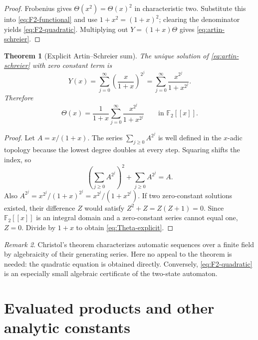 \documentclass[11pt,oneside]{article}
\newtheorem{theorem}{Theorem}[section]
\theoremstyle{definition}
\theoremstyle{remark}
\newtheorem{remark}[theorem]{Remark}
\newcommand{\F}{\mathbb F}
\newcommand{\1}{\mathbf 1}
\begin{document}
\begin{proof}
Frobenius gives \(\Theta(x^2)=\Theta(x)^2\) in characteristic two.  Substitute this into
\eqref{eq:F2-functional} and use \(1+x^2=(1+x)^2\); clearing the denominator yields
\eqref{eq:F2-quadratic}.  Multiplying out \(Y=(1+x)\Theta\) gives
\eqref{eq:artin-schreier}.
\end{proof}

\begin{theorem}[Explicit Artin--Schreier sum]
\label{thm:F2-explicit}
The unique solution of \eqref{eq:artin-schreier} with zero constant term is
\begin{equation}
 Y(x)=\sum_{j=0}^{\infty}\left(\frac{x}{1+x}\right)^{2^j}
     =\sum_{j=0}^{\infty}\frac{x^{2^j}}{1+x^{2^j}}.
 \label{eq:Y-explicit}
\end{equation}
Therefore
\begin{equation}
 \boxed{
 \Theta(x)=\frac1{1+x}
 \sum_{j=0}^{\infty}\frac{x^{2^j}}{1+x^{2^j}}}
 \qquad\text{in }\F_2[[x]].
 \label{eq:Theta-explicit}
\end{equation}
\end{theorem}

\begin{proof}
Let \(A=x/(1+x)\).  The series \(\sum_{j\ge0}A^{2^j}\) is well defined in the
\(x\)-adic topology because the lowest degree doubles at every step.  Squaring shifts the
index, so
\[
 \left(\sum_{j\ge0}A^{2^j}\right)^2+
 \sum_{j\ge0}A^{2^j}=A.
\]
Also \(A^{2^j}=x^{2^j}/(1+x)^{2^j}=x^{2^j}/(1+x^{2^j})\).  If two zero-constant solutions
existed, their difference \(Z\) would satisfy \(Z^2+Z=Z(Z+1)=0\).  Since
\(\F_2[[x]]\) is an integral domain and a zero-constant series cannot equal one, \(Z=0\).
Divide by \(1+x\) to obtain \eqref{eq:Theta-explicit}.
\end{proof}

\begin{remark}
Christol's theorem characterizes automatic sequences over a finite field by algebraicity of
their generating series.  Here no appeal to the theorem is needed: the quadratic equation is
obtained directly.  Conversely, \eqref{eq:F2-quadratic} is an especially small algebraic
certificate of the two-state automaton.
\end{remark}

\section{Evaluated products and other analytic constants}
\label{sec:constants}
\end{document}
